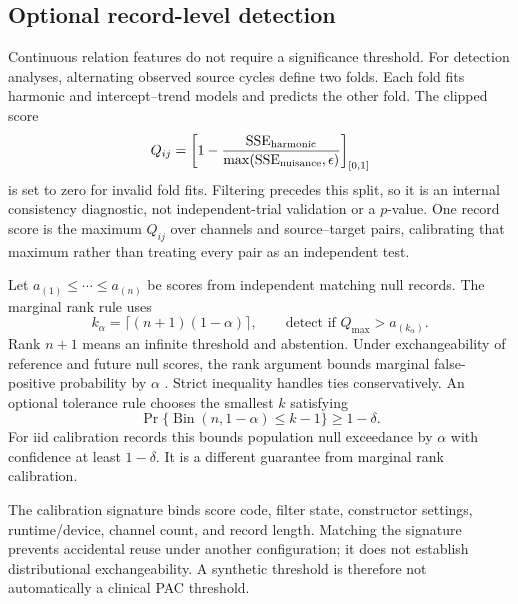 \documentclass[10pt,twocolumn,letterpaper]{article}
\begin{document}
\subsection{Optional record-level detection}
\label{app:operator-calibration}
Continuous relation features do not require a significance threshold.
For detection analyses, alternating observed source cycles define two
folds. Each fold fits harmonic and intercept--trend models and predicts
the other fold. The clipped score
\begin{equation}
Q_{ij}=\left[1-
 \frac{\mathrm{SSE}_{\rm harmonic}}
      {\max(\mathrm{SSE}_{\rm nuisance},\epsilon)}\right]_{[0,1]}
\label{eq:predictive-gain}
\end{equation}
is set to zero for invalid fold fits. Filtering precedes this split,
so it is an internal consistency diagnostic, not independent-trial
validation or a $p$-value. One record score is the maximum $Q_{ij}$
over channels and source--target pairs, calibrating that maximum rather
than treating every pair as an independent test.

Let $a_{(1)}\leq\cdots\leq a_{(n)}$ be scores from independent
matching null records. The marginal rank rule uses
\begin{equation}
k_\alpha=\lceil(n+1)(1-\alpha)\rceil,\qquad
\text{detect if }Q_{\max}>a_{(k_\alpha)}.
\label{eq:null-rank}
\end{equation}
Rank $n+1$ means an infinite threshold and abstention. Under
exchangeability of reference and future null scores, the rank argument
bounds marginal false-positive probability by $\alpha$
\citep{shafer2008conformal}. Strict inequality handles ties
conservatively. An optional tolerance rule chooses the smallest $k$
satisfying
\begin{equation}
\Pr\{\operatorname{Bin}(n,1-\alpha)\leq k-1\}
 \geq1-\delta.
\label{eq:null-tolerance}
\end{equation}
For iid calibration records this bounds population null exceedance by
$\alpha$ with confidence at least $1-\delta$. It is a different
guarantee from marginal rank calibration.

The calibration signature binds score code, filter state, constructor
settings, runtime/device, channel count, and record length. Matching
the signature prevents accidental reuse under another configuration;
it does not establish distributional exchangeability. A synthetic
threshold is therefore not automatically a clinical PAC threshold.
\end{document}
